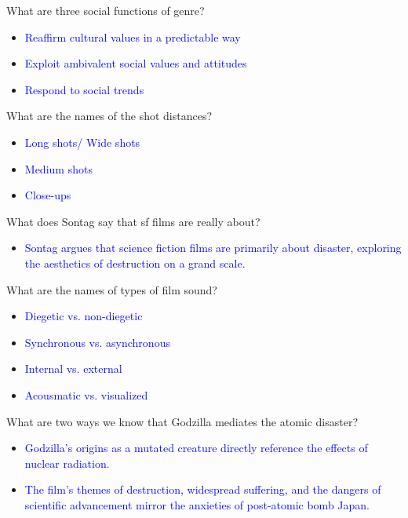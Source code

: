 \documentclass[11pt,fleqn]{book} %
\begin{document}
\begin{exercise}
What are three social functions of genre?
\begin{itemize}
\item \textcolor{blue}{Reaffirm cultural values in a predictable way}
\item \textcolor{blue}{Exploit ambivalent social values and attitudes}
\item \textcolor{blue}{Respond to social trends}
\end{itemize}
\end{exercise}

\begin{exercise}
What are the names of the shot distances?
\begin{itemize}
\item \textcolor{blue}{Long shots/ Wide shots}
\item \textcolor{blue}{Medium shots}
\item \textcolor{blue}{Close-ups}
\end{itemize}
\end{exercise}

\begin{exercise}
What does Sontag say that sf films are really about?
\begin{itemize}
\item \textcolor{blue}{Sontag argues that science fiction films are primarily about disaster, exploring the aesthetics of destruction on a grand scale.}
\end{itemize}
\end{exercise}

\begin{exercise}
What are the names of types of film sound?
\begin{itemize}
\item \textcolor{blue}{Diegetic vs. non-diegetic}
\item \textcolor{blue}{Synchronous vs. asynchronous}
\item \textcolor{blue}{Internal vs. external}
\item \textcolor{blue}{Acousmatic vs. visualized}
\end{itemize}
\end{exercise}

\begin{exercise}
What are two ways we know that Godzilla mediates the atomic disaster?
\begin{itemize}
\item \textcolor{blue}{Godzilla's origins as a mutated creature directly reference the effects of nuclear radiation.}
\item \textcolor{blue}{The film's themes of destruction, widespread suffering, and the dangers of scientific advancement mirror the anxieties of post-atomic bomb Japan.}
\end{itemize}
\end{exercise}
\end{document}
